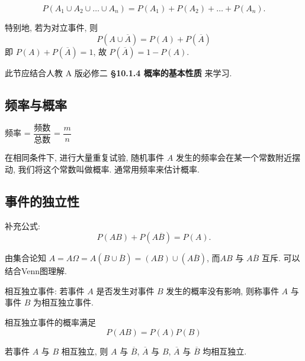 \documentclass[titlepage]{ctexart}
\begin{document}
\[
P(A_{1} \cup A_{2} \cup \dots \cup A_{n}) = P(A_{1}) + P(A_{2}) + \dots + P(A_{n}).
\]

特别地, 若为对立事件, 则
\[
P(A \cup \overline{A}) = P(A) + P(\overline{A})
\]
即 $P(A) + P(\overline{A}) = 1$, 故 $P(\overline{A}) = 1 - P(A)$.

此节应结合人教 A 版必修二 \textbf{\S{10.1.4} 概率的基本性质} 来学习.

\subsection{频率与概率}

频率 = $\dfrac{\text{频数}}{\text{总数}}$ = $\dfrac{m}{n}$

在相同条件下, 进行大量重复试验, 随机事件 $A$ 发生的频率会在某一个常数附近摆动, 我们将这个常数叫做概率. 通常用频率来估计概率.  

\subsection{事件的独立性}

补充公式:
\[
P(AB) + P(A \overline{B}) = P(A).
\]

由集合论知 $A = A\varOmega = A(B\cup \overline{B}) = (AB)\cup (A\overline{B})$, 而$AB$ 与 $A \overline{B}$ 互斥. 可以结合Venn图理解.

相互独立事件: 若事件 $A$ 是否发生对事件 $B$ 发生的概率没有影响, 则称事件 $A$ 与事件 $B$ 为相互独立事件.

相互独立事件的概率满足
\[
P(AB) = P(A)P(B)
\]

若事件 $A$ 与 $B$ 相互独立, 则 $A$ 与 $\overline{B}$, $\overline{A}$ 与 $B$, $\overline{A}$ 与 $\overline{B}$ 均相互独立.
\end{document}
